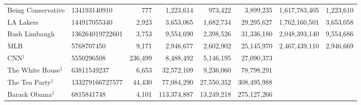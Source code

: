 \begin{longtable}{llrrrrrr}
                                Being Conservative &     134193140910 &     777 &   1,223,614 &    973,422 &   3,899,235 & 1,617,783,405 &  1,223,610 \\
                                         LA Lakers &     144917055340 &   2,923 &   3,653,065 &  1,682,734 &  29,295,627 & 1,762,160,501 &  3,653,058 \\
                                     Rush Limbaugh &  136264019722601 &   3,753 &   9,554,690 &  2,398,526 &  31,336,180 & 2,048,393,140 &  9,554,686 \\
                                               MLB &       5768707450 &   9,171 &   2,946,677 &  2,602,902 &  25,145,970 & 2,467,439,110 &  2,946,669 \\
                                    CNN$^\ddagger$ &       5550296508 & 236,499 &   8,488,492 &  5,146,195 &  27,090,373 &               &            \\
                        The White House$^\ddagger$ &      63811549237 &   6,653 &  32,572,109 &  9,236,060 &  78,798,291 &               &            \\
                          The Tea Party$^\ddagger$ &  133279166727577 &  44,430 &  77,084,290 & 27,550,352 & 308,495,988 &               &            \\
                           Barack Obama$^\ddagger$ &       6815841748 &   4,101 & 113,374,887 & 13,249,218 & 275,127,266 &               &            \\
\end{longtable}
